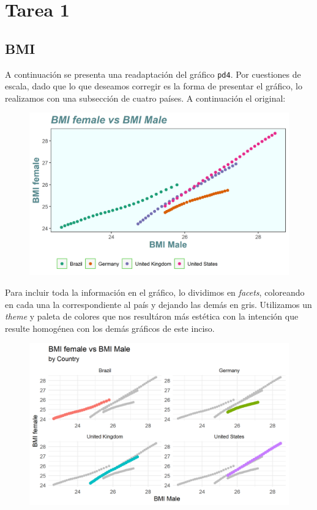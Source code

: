 \documentclass[9pt]{article}
\begin{document}
\section*{Tarea 1}
\subsection*{BMI}
A continuaci\'on se presenta una readaptaci\'on del gr\'afico \texttt{pd4}. Por cuestiones de escala, dado que lo que deseamos corregir es la forma de presentar el gr\'afico, lo realizamos con una subsecci\'on de cuatro pa\'ises. A continuaci\'on el original:
\begin{figure}[H]
    \centering
    \includegraphics{original3.png}
\end{figure}
Para incluir toda la informaci\'on en el gr\'afico, lo dividimos en \textit{facets}, coloreando en cada una la correspondiente al pa\'is y dejando las dem\'as en gris. Utilizamos un \textit{theme} y paleta de colores que nos result\'aron m\'as est\'etica con la intenci\'on que resulte homog\'enea con los dem\'as gr\'aficos de este inciso.
\begin{figure}[H]
    \centering
    \includegraphics{changed3.png}
\end{figure}
\end{document}
